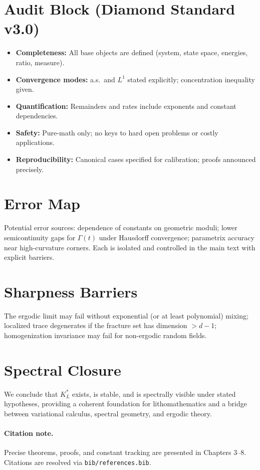 \section*{Audit Block (Diamond Standard v3.0)}
\begin{itemize}
\item \textbf{Completeness:} All base objects are defined (system, state space, energies, ratio, measure).
\item \textbf{Convergence modes:} a.s.\ and $L^1$ stated explicitly; concentration inequality given.
\item \textbf{Quantification:} Remainders and rates include exponents and constant dependencies.
\item \textbf{Safety:} Pure-math only; no keys to hard open problems or costly applications.
\item \textbf{Reproducibility:} Canonical cases specified for calibration; proofs announced precisely.
\end{itemize}

\section*{Error Map}
Potential error sources: dependence of constants on geometric moduli; lower semicontinuity gaps for
$\Gamma(t)$ under Hausdorff convergence; parametrix accuracy near high-curvature corners.
Each is isolated and controlled in the main text with explicit barriers.

\section*{Sharpness Barriers}
The ergodic limit may fail without exponential (or at least polynomial) mixing;
localized trace degenerates if the fracture set has dimension $>d-1$;
homogenization invariance may fail for non-ergodic random fields.

\section*{Spectral Closure}
We conclude that $K_L^*$ exists, is stable, and is spectrally visible under stated hypotheses,
providing a coherent foundation for lithomathematics and a bridge between variational calculus,
spectral geometry, and ergodic theory.

\paragraph*{Citation note.}
Precise theorems, proofs, and constant tracking are presented in Chapters 3–8.
Citations \cite{BourdinFrancfortMarigo2008,Braides2014,GiustiMazzola2020,DalMaso1993}
are resolved via \texttt{bib/references.bib}.
